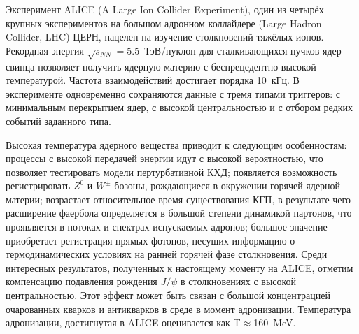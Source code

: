 
Эксперимент ALICE (A Large Ion Collider Experiment), один из четырёх крупных экспериментов на большом адронном коллайдере (Large Hadron Collider, LHC) ЦЕРН, нацелен на изучение столкновений тяжёлых ионов. Рекордная энергия $\sqrt{s_{NN}}=5.5$~\mbox{ТэВ/нуклон} для сталкивающихся пучков ядер свинца позволяет получить ядерную материю с беспрецедентно высокой температурой. Частота взаимодействий достигает порядка 10~кГц. В эксперименте одновременно сохраняются данные с тремя типами триггеров: с минимальным перекрытием ядер, с высокой центральностью и с отбором редких событий заданного типа.

Высокая температура ядерного вещества приводит к следующим особенностям: процессы с высокой передачей энергии идут с высокой вероятностью, что позволяет тестировать модели пертурбативной КХД; появляется возможность регистрировать $Z^{0}$ и $W^{\pm}$ бозоны, рождающиеся в окружении горячей ядерной материи; возрастает относительное время существования КГП, в результате чего расширение фаербола определяется в большой степени динамикой партонов, что проявляется в потоках и спектрах испускаемых адронов; большое значение приобретает регистрация прямых фотонов, несущих информацию о термодинамических условиях на ранней горячей фазе столкновения. Среди интересных результатов, полученных к настоящему моменту на ALICE, отметим компенсацию подавления рождения $J/\psi$ в столкновениях с высокой центральностью. Этот эффект может быть связан с большой концентрацией очарованных кварков и антикварков в среде в момент адронизации. Температура адронизации, достигнутая в ALICE оценивается как T$\approx$160~MeV.




